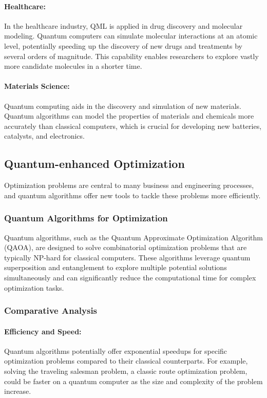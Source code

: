 \documentclass{book}
\begin{document}
\paragraph{Healthcare:} In the healthcare industry, QML is applied in drug discovery and molecular modeling. Quantum computers can simulate molecular interactions at an atomic level, potentially speeding up the discovery of new drugs and treatments by several orders of magnitude. This capability enables researchers to explore vastly more candidate molecules in a shorter time.

\paragraph{Materials Science:} Quantum computing aids in the discovery and simulation of new materials. Quantum algorithms can model the properties of materials and chemicals more accurately than classical computers, which is crucial for developing new batteries, catalysts, and electronics.

\subsection{Quantum-enhanced Optimization}
Optimization problems are central to many business and engineering processes, and quantum algorithms offer new tools to tackle these problems more efficiently.

\subsubsection{Quantum Algorithms for Optimization}
Quantum algorithms, such as the Quantum Approximate Optimization Algorithm (QAOA), are designed to solve combinatorial optimization problems that are typically NP-hard for classical computers. These algorithms leverage quantum superposition and entanglement to explore multiple potential solutions simultaneously and can significantly reduce the computational time for complex optimization tasks.

\subsubsection{Comparative Analysis}
\paragraph{Efficiency and Speed:} Quantum algorithms potentially offer exponential speedups for specific optimization problems compared to their classical counterparts. For example, solving the traveling salesman problem, a classic route optimization problem, could be faster on a quantum computer as the size and complexity of the problem increase.
\end{document}
